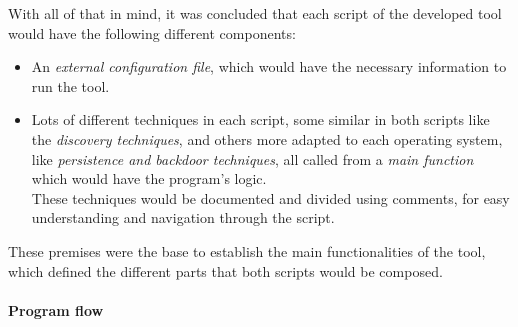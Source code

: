 \pagebreak
With all of that in mind, it was concluded that each script of the developed tool would have the following different components:
\begin{itemize}
\item An \textit{external configuration file}, 
which would have the necessary information to run the tool.
\item Lots of different techniques in each script, some similar in both scripts like the \textit{discovery techniques}, and others more adapted to each operating system, like \textit{persistence and backdoor techniques}, all called from a \textit{main function} which would have the program's logic.\\ 
These techniques would be documented and divided using comments, for easy understanding and navigation through the script.
\end{itemize}


These premises were the base to establish the main functionalities of the tool, which defined the different parts that both scripts would be composed.

\paragraph{Program flow}

